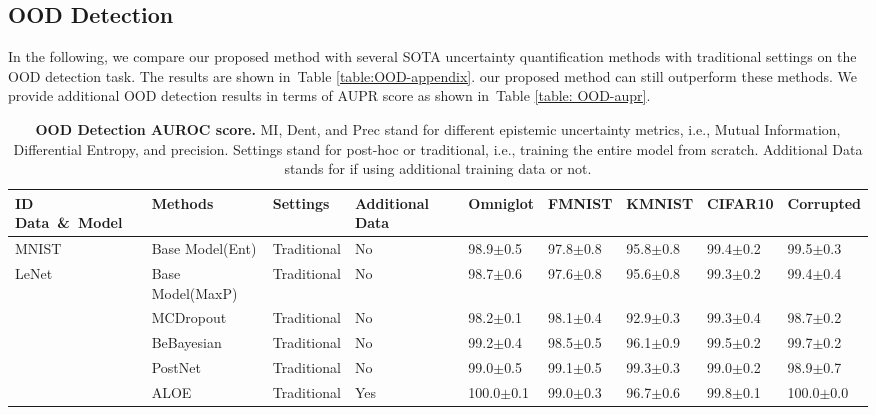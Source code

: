 \subsection{OOD Detection}
In the following, we compare our proposed method with several SOTA uncertainty quantification methods with traditional settings on the OOD detection task. The results are shown in~Table \ref{table:OOD-appendix}.  our proposed method can still outperform these methods.
We provide additional OOD detection results in terms of AUPR score as shown in~Table \ref{table: OOD-aupr}.
\begin{table}[t]
  \begin{center}
  \scriptsize
  \captionsetup{font=small}
  \caption{\textbf{OOD Detection AUROC score.} MI, Dent, and Prec stand for different epistemic uncertainty metrics, i.e., Mutual Information, Differential Entropy, and precision. Settings stand for post-hoc or traditional, i.e., training the entire model from scratch. Additional Data stands for if using additional training data or not.}
  \vspace{-1.5em}
  \begin{tabular}{lllllllll}
    \\
    \toprule
    \textbf{ID Data}\ \&\ \textbf{Model} & \textbf{Methods} & \textbf{Settings} & \textbf{Additional Data} & \textbf{Omniglot}& \textbf{FMNIST} & \textbf{KMNIST}& \textbf{CIFAR10} &\textbf{Corrupted} \\
    \hline
    MNIST & Base Model(Ent) & Traditional & No & 98.9$\pm$0.5 & 97.8$\pm$0.8 & 95.8$\pm$0.8 & 99.4$\pm$0.2 & 99.5$\pm$0.3  \\
    LeNet & Base Model(MaxP) & Traditional & No & 98.7$\pm$0.6 & 97.6$\pm$0.8 & 95.6$\pm$0.8 & 99.3$\pm$0.2 & 99.4$\pm$0.4  \\
              & MCDropout & Traditional & No & 98.2$\pm$0.1 & 98.1$\pm$0.4 & 92.9$\pm$0.3 & 99.3$\pm$0.4 & 98.7$\pm$0.2  \\
              & BeBayesian & Traditional & No & 99.2$\pm$0.4 & 98.5$\pm$0.5 & 96.1$\pm$0.9 & 99.5$\pm$0.2 & 99.7$\pm$0.2  \\
              & PostNet & Traditional & No & 99.0$\pm$0.5 & 99.1$\pm$0.5 & 99.3$\pm$0.3 & 99.0$\pm$0.2 & 98.9$\pm$0.7  \\
              & ALOE & Traditional & Yes & 100.0$\pm$0.1 & 99.0$\pm$0.3 & 96.7$\pm$0.6 & 99.8$\pm$0.1 & 100.0$\pm$0.0  \\

\end{tabular}
\end{center}
\end{table}
